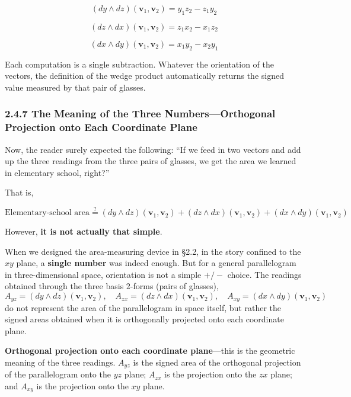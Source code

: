 \[
(dy \wedge dz)(\mathbf{v}_1, \mathbf{v}_2) = y_1 z_2 - z_1 y_2
\]

\[
(dz \wedge dx)(\mathbf{v}_1, \mathbf{v}_2) = z_1 x_2 - x_1 z_2
\]

\[
(dx \wedge dy)(\mathbf{v}_1, \mathbf{v}_2) = x_1 y_2 - x_2 y_1
\]

Each computation is a single subtraction. Whatever the orientation of
the vectors, the definition of the wedge product automatically returns
the signed value measured by that pair of glasses.

\hypertarget{the-meaning-of-the-three-numbersorthogonal-projection-onto-each-coordinate-plane}{%
\subsubsection{2.4.7 The Meaning of the Three Numbers---Orthogonal
Projection onto Each Coordinate
Plane}\label{the-meaning-of-the-three-numbersorthogonal-projection-onto-each-coordinate-plane}}

Now, the reader surely expected the following: ``If we feed in two
vectors and add up the three readings from the three pairs of glasses,
we get the area we learned in elementary school, right?''

That is,

\[
\text{Elementary-school area} \stackrel{?}{=} (dy \wedge dz)(\mathbf{v}_1, \mathbf{v}_2) + (dz \wedge dx)(\mathbf{v}_1, \mathbf{v}_2) + (dx \wedge dy)(\mathbf{v}_1, \mathbf{v}_2)
\]

However, \textbf{it is not actually that simple}.

When we designed the area-measuring device in §2.2, in the story
confined to the \(xy\) plane, a \textbf{single number} was indeed
enough. But for a general parallelogram in three-dimensional space,
orientation is not a simple \(+/-\) choice. The readings obtained
through the three basis \(2\)-forms (pairs of glasses),
\[A_{yz} = (dy \wedge dz)(\mathbf{v}_1,\mathbf{v}_2),\quad A_{zx} = (dz \wedge dx)(\mathbf{v}_1,\mathbf{v}_2),\quad A_{xy} = (dx \wedge dy)(\mathbf{v}_1,\mathbf{v}_2)\]
do not represent the area of the parallelogram in space itself, but
rather the signed areas obtained when it is orthogonally projected onto
each coordinate plane.

\textbf{Orthogonal projection onto each coordinate plane}---this is the
geometric meaning of the three readings. \(A_{yz}\) is the signed area
of the orthogonal projection of the parallelogram onto the \(yz\) plane;
\(A_{zx}\) is the projection onto the \(zx\) plane; and \(A_{xy}\) is
the projection onto the \(xy\) plane.

